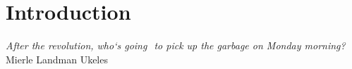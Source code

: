 \documentclass[nofonts,nols,justified,nobib]{tufte-book}
\begin{document}
\tableofcontents


\newpage
\setcounter{page}{1}
\renewcommand{\thepage}{\arabic{page}}

\chapter*{Introduction}

\begin{flushright}
\begin{flushright}
\emph{After the revolution, who`s going  to pick up the garbage on Monday morning?} \cite{ukeles_manifesto_1969}\\
Mierle Landman Ukeles
\end{flushright}
\end{flushright}
\end{document}
